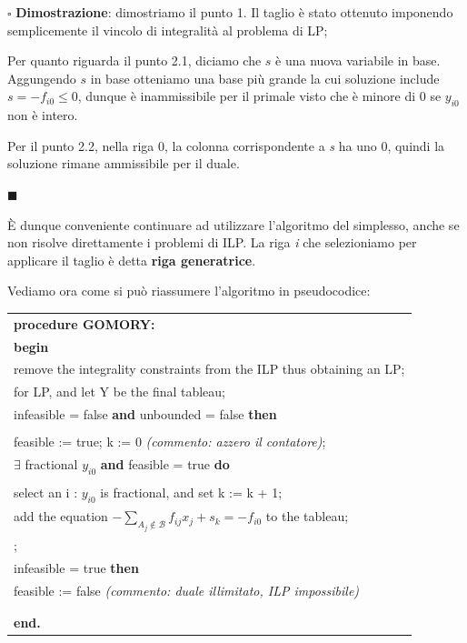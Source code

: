\documentclass[11pt]{book}
\begin{document}
\vspace{11pt}
$\square$ {\bf Dimostrazione}: dimostriamo il punto 1. Il taglio \`e
stato ottenuto imponendo semplicemente il vincolo di integralit\`a al
problema di LP;

Per quanto riguarda il punto 2.1, diciamo che $s$ \`e una nuova
variabile in base. Aggungendo $s$ in base otteniamo una base pi\`u
grande la cui soluzione include $s = -f_{i0} \leq 0$, dunque \`e
inammissibile per il primale visto che \`e minore di 0 se $y_{i0}$ non
\`e intero.

Per il punto 2.2, nella riga 0, la colonna corrispondente a {\em s} ha
uno 0, quindi la soluzione rimane ammissibile per il duale.

$\blacksquare$
\vspace{11pt}

\`E dunque conveniente continuare ad utilizzare l'algoritmo del
simplesso, anche se non risolve direttamente i problemi di ILP. La
riga {\em i} che selezioniamo per applicare il taglio \`e detta {\bf
  riga generatrice}.

Vediamo ora come si pu\`o riassumere l'algoritmo in pseudocodice:

\small
\vspace{11pt}
\begin{center}
\begin{tabular}{||l||}
\hline\hline
{\bf procedure GOMORY:}\\
{\bf begin}\\
\phantom{aa}remove the integrality constraints from the ILP thus obtaining an LP;\\
\phantom{aa}{\bf call TWO PHASE} for LP, and let Y be the final tableau;\\
\phantom{aa}{\bf if} infeasible = false {\bf and} unbounded = false {\bf then}\\
\phantom{aaaa}{\bf begin}\\
\phantom{aaaaaa}feasible := true; k := 0 {\em (commento: azzero il contatore)};\\
\phantom{aaaaaa}{\bf while} $\exists$ fractional $y_{i0}$ {\bf and} feasible = true {\bf do}\\
\phantom{aaaaaaaa}{\bf begin}\\
\phantom{aaaaaaaaaa}select an i : $y_{i0}$ is fractional, and set k := k + 1;\\
\phantom{aaaaaaaaaa}add the equation $- \sum\limits_{A_j \not \in \mathcal{B}} f_{ij} x_{j} + s_k = -f_{i0}$ to the tableau;\\
\phantom{aaaaaaaaaa}{\bf call DUAL SIMPLEX};\\
\phantom{aaaaaaaaaa}{\bf if} infeasible = true {\bf then}\\
\phantom{aaaaaaaaaaaa}feasible := false {\em (commento: duale
  illimitato, ILP impossibile)}\\
\phantom{aaaaaaaa}{\bf end}\\
\phantom{aaaa}{\bf end}\\
{\bf end.}\\
\hline\hline
\end{tabular}
\end{center}
\vspace{11pt}
\normalsize
\end{document}
